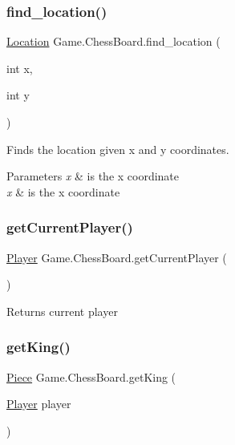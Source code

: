 \subsubsection{\texorpdfstring{find\+\_\+location()}{find\_location()}}
{\footnotesize\ttfamily \hyperlink{class_game_1_1_location}{Location} Game.\+Chess\+Board.\+find\+\_\+location (\begin{DoxyParamCaption}\item[{int}]{x,  }\item[{int}]{y }\end{DoxyParamCaption})\hspace{0.3cm}{\ttfamily [inline]}}

Finds the location given x and y coordinates. 
\begin{DoxyParams}{Parameters}
{\em x} & is the x coordinate \\
\hline
{\em x} & is the x coordinate \\
\hline
\end{DoxyParams}
\mbox{\label{class_game_1_1_chess_board_af26bbaf05bffe9f911e10ad3e2843c6a}} 
\subsubsection{\texorpdfstring{get\+Current\+Player()}{getCurrentPlayer()}}
{\footnotesize\ttfamily \hyperlink{class_game_1_1_player}{Player} Game.\+Chess\+Board.\+get\+Current\+Player (\begin{DoxyParamCaption}{ }\end{DoxyParamCaption})\hspace{0.3cm}{\ttfamily [inline]}}

Returns current player \mbox{\label{class_game_1_1_chess_board_af7f79327e5c2e5ed8f60715736e684d2}} 
\subsubsection{\texorpdfstring{get\+King()}{getKing()}}
{\footnotesize\ttfamily \hyperlink{class_game_1_1_piece}{Piece} Game.\+Chess\+Board.\+get\+King (\begin{DoxyParamCaption}\item[{\hyperlink{class_game_1_1_player}{Player}}]{player }\end{DoxyParamCaption})\hspace{0.3cm}{\ttfamily [inline]}}

